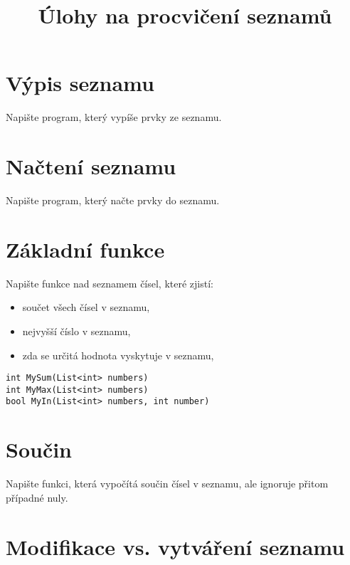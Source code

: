 \documentclass[12pt,a4paper]{article}
\begin{document}
\pagestyle{empty}
\title{Úlohy na procvičení seznamů}
\date{\vspace{-10ex}}
\setlength{\droptitle}{-6em}
\maketitle

\setlength\parindent{0pt}


\section{Výpis seznamu}

Napište program, který vypíše prvky ze seznamu.

\section{Načtení seznamu}

Napište program, který načte prvky do seznamu.

\section{Základní funkce}

Napište funkce nad seznamem čísel, které zjistí:

\begin{itemize}[noitemsep,nolistsep]
	\item součet všech čísel v seznamu,
	\item nejvyšší číslo v seznamu,
	\item zda se určitá hodnota vyskytuje v seznamu,
\end{itemize}

\begin{verbatim}
int MySum(List<int> numbers)
int MyMax(List<int> numbers)
bool MyIn(List<int> numbers, int number)
\end{verbatim}

\section{Součin}

Napište funkci, která vypočítá součin čísel v seznamu, ale ignoruje přitom
případné nuly.

\section{Modifikace vs. vytváření seznamu}
\end{document}
